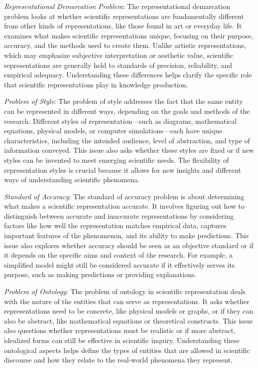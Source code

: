 \emph{Representational Demarcation Problem}: The representational demarcation problem looks at whether scientific representations are fundamentally different from other kinds of representations, like those found in art or everyday life. It examines what makes scientific representations unique, focusing on their purpose, accuracy, and the methods used to create them. Unlike artistic representations, which may emphasize subjective interpretation or aesthetic value, scientific representations are generally held to standards of precision, reliability, and empirical adequacy. Understanding these differences helps clarify the specific role that scientific representations play in knowledge production.

\emph{Problem of Style}: The problem of style addresses the fact that the same entity can be represented in different ways, depending on the goals and methods of the research. Different styles of representation—such as diagrams, mathematical equations, physical models, or computer simulations—each have unique characteristics, including the intended audience, level of abstraction, and type of information conveyed. This issue also asks whether these styles are fixed or if new styles can be invented to meet emerging scientific needs. The flexibility of representation styles is crucial because it allows for new insights and different ways of understanding scientific phenomena.

\emph{Standard of Accuracy}: The standard of accuracy problem is about determining what makes a scientific representation accurate. It involves figuring out how to distinguish between accurate and inaccurate representations by considering factors like how well the representation matches empirical data, captures important features of the phenomenon, and its ability to make predictions. This issue also explores whether accuracy should be seen as an objective standard or if it depends on the specific aims and context of the research. For example, a simplified model might still be considered accurate if it effectively serves its purpose, such as making predictions or providing explanations.

\emph{Problem of Ontology}: The problem of ontology in scientific representation deals with the nature of the entities that can serve as representations. It asks whether representations need to be concrete, like physical models or graphs, or if they can also be abstract, like mathematical equations or theoretical constructs. This issue also questions whether representations must be realistic or if more abstract, idealized forms can still be effective in scientific inquiry. Understanding these ontological aspects helps define the types of entities that are allowed in scientific discourse and how they relate to the real-world phenomena they represent.

